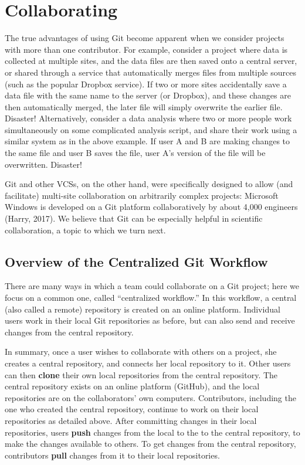 \documentclass[
  american,
  ,doc,floatsintext]{apa6}
\begin{document}
\hypertarget{collaborating}{%
\section{Collaborating}\label{collaborating}}

The true advantages of using Git become apparent when we consider projects with more than one contributor. For example, consider a project where data is collected at multiple sites, and the data files are then saved onto a central server, or shared through a service that automatically merges files from multiple sources (such as the popular Dropbox service). If two or more sites accidentally save a data file with the same name to the server (or Dropbox), and these changes are then automatically merged, the later file will simply overwrite the earlier file. Disaster! Alternatively, consider a data analysis where two or more people work simultaneously on some complicated analysis script, and share their work using a similar system as in the above example. If user A and B are making changes to the same file and user B saves the file, user A's version of the file will be overwritten. Disaster!

Git and other VCSs, on the other hand, were specifically designed to allow (and facilitate) multi-site collaboration on arbitrarily complex projects: Microsoft Windows is developed on a Git platform collaboratively by about 4,000 engineers (Harry, 2017). We believe that Git can be especially helpful in scientific collaboration, a topic to which we turn next.

\hypertarget{overview-of-the-centralized-git-workflow}{%
\subsection{Overview of the Centralized Git Workflow}\label{overview-of-the-centralized-git-workflow}}

There are many ways in which a team could collaborate on a Git project; here we focus on a common one, called ``centralized workflow.'' In this workflow, a central (also called a remote) repository is created on an online platform. Individual users work in their local Git repositories as before, but can also send and receive changes from the central repository.

In summary, once a user wishes to collaborate with others on a project, she creates a central repository, and connects her local repository to it. Other users can then \textbf{clone} their own local repositories from the central repository. The central repository exists on an online platform (GitHub), and the local repositories are on the collaborators' own computers. Contributors, including the one who created the central repository, continue to work on their local repositories as detailed above. After committing changes in their local repositories, users \textbf{push} changes from the local to the to the central repository, to make the changes available to others. To get changes from the central repository, contributors \textbf{pull} changes from it to their local repositories.
\end{document}
